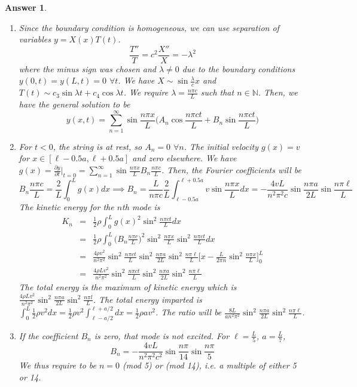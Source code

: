 \documentclass[a4paper]{article}
\newtheorem{ans}{Answer}[section]
\theoremstyle{new}
\begin{document}
\begin{ans}\leavevmode
\begin{enumerate}[label=(\alph*)]
\item Since the boundary condition is homogeneous, we can use separation of variables $y=X(x)T(t)$.
$$\frac{T''}{T}=c^2\frac{X''}{X}=-\lambda^2$$
where the minus sign was chosen and $\lambda\neq 0$ due to the boundary conditions $y(0,t)=y(L,t)=0$ $\forall t$. We have $X\sim\sin\frac{\lambda}{c}x$ and $T(t)\sim c_3\sin\lambda t+c_4\cos\lambda t$. We require $\lambda=\frac{n\pi c}{L}$ such that $n\in\mathbb{N}$. Then, we have the general solution to be
$$y(x,t)=\sum_{n=1}^\infty\sin\frac{n\pi x}{L}\bigg(A_n\cos\frac{n\pi ct}{L}+B_n\sin\frac{n\pi ct}{L}\bigg)$$
\item For $t<0$, the string is at rest, so $A_n=0$ $\forall n$. The initial velocity $g(x)=v$ for $x\in[\ell-0.5a,\ell+0.5a]$ and zero elsewhere. We have $g(x)=\frac{\partial y}{\partial t}|_{t=0}=\sum_{n=1}^\infty\sin\frac{n\pi x}{L}B_n\frac{n\pi c}{L}$. Then, the Fourier coefficients will be
$$B_n\frac{n\pi c}{L}=\frac{2}{L}\int_0^Lg(x)dx\implies B_n=\frac{L}{n\pi c}\frac{2}{L}\int_{\ell-0.5a}^{\ell+0.5a}v\sin\frac{n\pi x}{L}dx=-\frac{4vL}{n^2\pi^2c}\sin\frac{n\pi a}{2L}\sin\frac{n\pi\ell}{L}$$
The kinetic energy for the $n$th mode is
\begin{eqnarray}
K_n&=&\frac{1}{2}\rho\int_0^Lg(x)^2\sin^2\frac{n\pi ct}{L}dx\nonumber\\&=&\frac{1}{2}\rho\int_0^L\bigg(B_n\frac{n\pi c}{L}\bigg)^2\sin^2\frac{n\pi x}{L}\sin^2\frac{n\pi ct}{L}dx\nonumber\\&=&\frac{4\rho v^2}{n^2\pi^2}\sin^2\frac{n\pi ct}{L}\sin^2\frac{n\pi a}{2L}\sin^2\frac{n\pi \ell}{L}\bigg[x-\frac{L}{2\pi n}\sin^2\frac{n\pi x}{L}\bigg]_0^L\nonumber\\&=&\frac{4\rho Lv^2}{n^2\pi^2}\sin^2\frac{n\pi ct}{L}\sin^2\frac{n\pi a}{2L}\sin^2\frac{n\pi \ell}{L}\nonumber
\end{eqnarray}
The total energy is the maximum of kinetic energy which is $\frac{4\rho Lv^2}{n^2\pi^2}\sin^2\frac{n\pi a}{2L}\sin^2\frac{n\pi l}{L}$. The total energy imparted is $\int_0^L\frac{1}{2}\rho v^2dx=\frac{1}{2}\rho v^2\int_{\ell-a/2}^{\ell+a/2}dx=\frac{1}{2}\rho av^2$. The ratio will be $\frac{8L}{an^2\pi^2}\sin^2\frac{n\pi a}{2L}\sin^2\frac{n\pi\ell}{L}$.
\item If the coefficient $B_n$ is zero, that mode is not excited. For $\ell=\frac{L}{5}$, $a=\frac{L}{7}$, 
$$B_n=-\frac{4vL}{n^2\pi^2c^2}\sin\frac{n\pi}{14}\sin\frac{n\pi}{5}$$
We thus require to be $n=0$ (mod 5) or (mod 14), i.e. a multiple of either 5 or 14.
\end{enumerate}
\end{ans}
\end{document}
